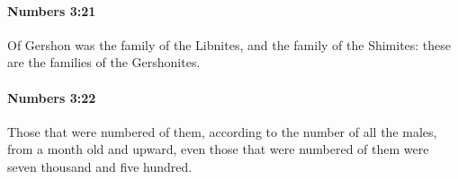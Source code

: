 		\paragraph{Numbers 3:21} %
			\label{NUMBERS-3-21}

			Of Gershon was the family of the Libnites, and the family of the Shimites: these are the families of the Gershonites.


		\paragraph{Numbers 3:22} %
			\label{NUMBERS-3-22}

			Those that were numbered of them, according to the number of all the males, from a month old and upward, even those that were numbered of them were seven thousand and five hundred.


